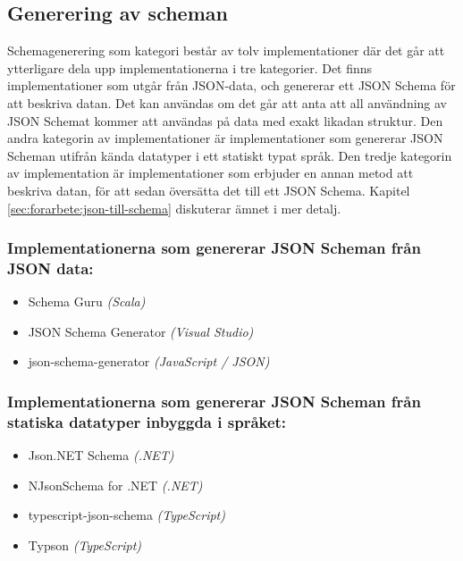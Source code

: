 \subsection{Generering av scheman}
\label{sec:teori:schema-användningsområden:generering}
Schemagenerering som kategori består av tolv implementationer där det går att ytterligare dela upp implementationerna i tre kategorier. Det finns implementationer som utgår från JSON-data, och genererar ett JSON Schema för att beskriva datan. Det kan användas om det går att anta att all användning av JSON Schemat kommer att användas på data med exakt likadan struktur. Den andra kategorin av implementationer är implementationer som genererar JSON Scheman utifrån kända datatyper i ett statiskt typat språk. Den tredje kategorin av implementation är implementationer som erbjuder en annan metod att beskriva datan, för att sedan översätta det till ett JSON Schema. Kapitel \ref{sec:forarbete:json-till-schema} diskuterar ämnet i mer detalj.

\subsubsection{Implementationerna som genererar JSON Scheman från JSON data:}
\begin{itemize}
	\item Schema Guru \textit{(Scala)} \cite{Snowplow}
	\item JSON Schema Generator \textit{(Visual Studio)} \cite{MadsKristensen}
	\item json-schema-generator \textit{(JavaScript / JSON)} \cite{Romanovich}
\end{itemize}

\subsubsection{Implementationerna som genererar JSON Scheman från statiska datatyper inbyggda i språket:}
\begin{itemize}
	\item Json.NET Schema \textit{(.NET)} \cite{Newtonsoft}
	\item NJsonSchema for .NET \textit{(.NET)} \cite{Suter}
	\item typescript-json-schema \textit{(TypeScript)} \cite{El-Dardiry}
	\item Typson \textit{(TypeScript)} \cite{Bovet}
\end{itemize}

